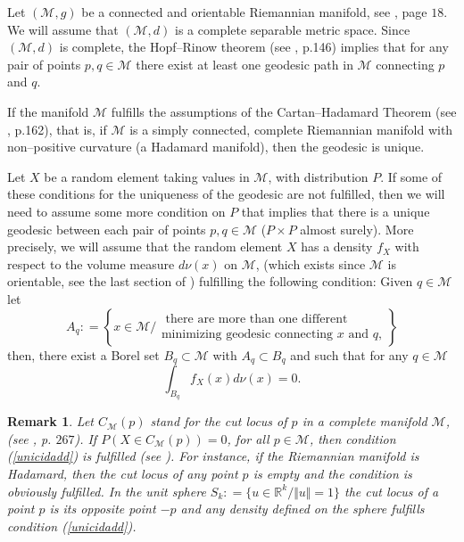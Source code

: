 \documentclass[a4paper]{article}
\def\defeq{\mathrel{\mathop:}=}
\numberwithin{equation}{section}
\newtheorem{remark}{Remark}
\def\defeq{\mathrel{\mathop:}=}
\newcommand{\M}{\mbox{$\mathcal{M}$}}
\begin{document}
Let $(\M,g)$ be a connected and orientable Riemannian manifold, see \cite{docarmo1992}, page $18$. 
We will assume that  $(\M,d)$ is a complete  separable metric space. Since $(\M,d)$ is complete, the Hopf--Rinow theorem 
(see \cite{docarmo1992}, p.146) implies that for any pair of points $p,q \in \M$  there exist at least one geodesic path in $\M$ connecting $p$ and $q$. 
   
  If the manifold $\M$ fulfills the assumptions of the Cartan--Hadamard Theorem (see \cite{petersen2006}, p.162), that is, if $\M$ is a simply connected, complete Riemannian manifold with non--positive curvature (a Hadamard manifold), then the geodesic is unique.
  
  Let $X$ be a random element taking values in $\M$, with distribution $P$. If some of these conditions for the uniqueness of the geodesic are not fulfilled, then we will need to assume some more condition on $P$ that implies that there is a unique geodesic between each pair of points $p,q \in \M$ ($P \times P$ almost surely). More precisely, we will assume that the random element $X$ has a density $f_X$ with respect to the volume measure $d \nu(x)$ on $\M$, (which exists since $\M$ is orientable, see  the last section of \cite{folland2013}) fulfilling the following condition:
Given $q \in \M$ let 
\begin{equation}
A_q\defeq \left\{x \in \M  \Big/
\begin{array}{ll}
\textrm{ there are more than one different } \\ 
\textrm{minimizing geodesic connecting $x$ and $q$,}
\end{array} \right \}
\end{equation}
then, there exist a Borel set $B_q \subset \M$ with $A_q \subset B_q$ and such that for any  $q \in \M$
\begin{equation}
\label{unicidadd}
\int_{B_q} f_X(x) d \nu(x)=0.
\end{equation}
\begin{remark}
Let $C_{\M}(p)$ stand for the  cut locus of $p$ in a complete manifold $\M$, (see \cite{docarmo1992}, p. $267$).  If $P \left( X \in C_{\M}(p)\right) = 0$,  for all   $p \in \M$, then condition  (\ref{unicidadd}) is fulfilled (see \cite{pennec2006}). For instance, if the Riemannian manifold is Hadamard, then the cut locus of any point $p$ is empty and the condition is obviously fulfilled. In the unit sphere $S_{k} \defeq \{u \in \mathbb{R}^k / \Vert u \Vert= 1 \}$  the cut locus of a point $p$ is its opposite point  $-p$ and any  density defined on the sphere fulfills condition  (\ref{unicidadd}).
\end{remark}
\end{document}

